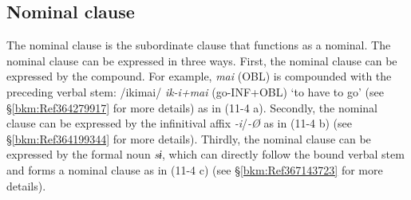 \subsection{Nominal clause}
\label{bkm:Ref365191598}\hypertarget{RefHeadingToc395697254}{}\label{bkm:Ref365541635}
The nominal clause is the subordinate clause that functions as a nominal. The nominal clause can be expressed in three ways. First, the nominal clause can be expressed by the compound. For example, \textit{mai} (OBL) is compounded with the preceding verbal stem: /ikimai/ \textit{ik-i+mai} (go-INF+OBL) ‘to have to go’ (see §\ref{bkm:Ref364279917} for more details) as in (11-4 a). Secondly, the nominal clause can be expressed by the infinitival affix \textit{{}-i}/\textit{{}-Ø} as in (11-4 b) (see §\ref{bkm:Ref364199344} for more details). Thirdly, the nominal clause can be expressed by the formal noun \textit{sɨ}, which can directly follow the bound verbal stem and forms a nominal clause as in (11-4 c) (see §\ref{bkm:Ref367143723} for more details).

\tablefirsthead{}

